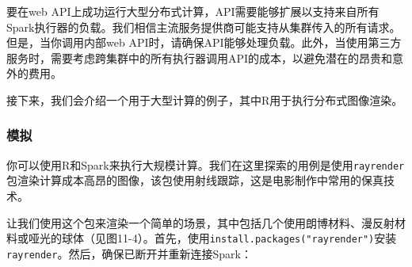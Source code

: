 \documentclass[
]{article}
\newenvironment{Shaded}{\begin{snugshade}}{\end{snugshade}}
\newcommand{\DataTypeTok}[1]{\textcolor[rgb]{0.13,0.29,0.53}{#1}}
\newcommand{\DecValTok}[1]{\textcolor[rgb]{0.00,0.00,0.81}{#1}}
\newcommand{\KeywordTok}[1]{\textcolor[rgb]{0.13,0.29,0.53}{\textbf{#1}}}
\newcommand{\NormalTok}[1]{#1}
\newcommand{\OperatorTok}[1]{\textcolor[rgb]{0.81,0.36,0.00}{\textbf{#1}}}
\newcommand{\OtherTok}[1]{\textcolor[rgb]{0.56,0.35,0.01}{#1}}
\newcommand{\StringTok}[1]{\textcolor[rgb]{0.31,0.60,0.02}{#1}}
\begin{document}
要在web
API上成功运行大型分布式计算，API需要能够扩展以支持来自所有Spark执行器的负载。我们相信主流服务提供商可能支持从集群传入的所有请求。但是，当你调用内部web
API时，请确保API能够处理负载。此外，当使用第三方服务时，需要考虑跨集群中的所有执行器调用API的成本，以避免潜在的昂贵和意外的费用。

接下来，我们会介绍一个用于大型计算的例子，其中R用于执行分布式图像渲染。

\hypertarget{ux6a21ux62df}{%
\subsubsection{模拟}\label{ux6a21ux62df}}

你可以使用R和Spark来执行大规模计算。我们在这里探索的用例是使用\texttt{rayrender}包渲染计算成本高昂的图像，该包使用射线跟踪，这是电影制作中常用的保真技术。

让我们使用这个包来渲染一个简单的场景，其中包括几个使用朗博材料、漫反射材料或哑光的球体（见图11-4）。首先，使用\texttt{install.packages("rayrender")}安装\texttt{rayrender}。然后，确保已断开并重新连接Spark：

\begin{Shaded}
\end{Shaded}
\end{document}
